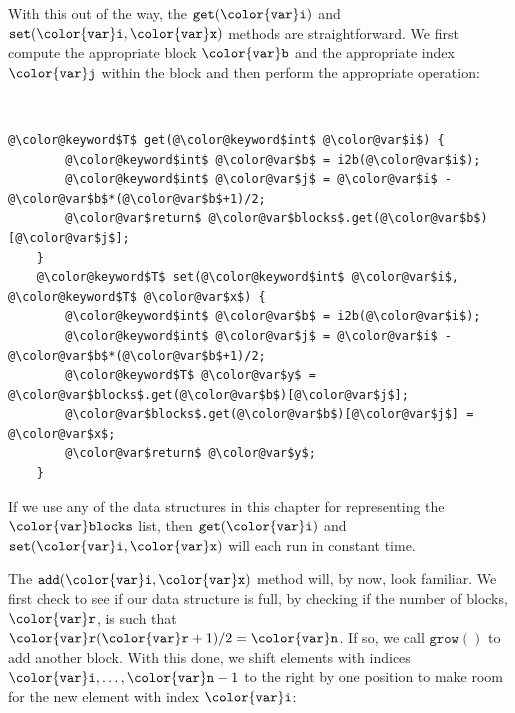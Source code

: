 \documentclass[10pt]{book}
\theoremstyle{plain}
\theoremstyle{definition}
\begin{document}
With this out of the way, the \ensuremath{\mathtt{get({\color{var}i})}} and \ensuremath{\mathtt{set({\color{var}i},{\color{var}x})}} methods are straightforward.  We first compute the appropriate block \ensuremath{\mathtt{{\color{var}b}}} and the appropriate index \ensuremath{\mathtt{{\color{var}j}}} within the block and then perform the appropriate operation:



 \ \vspace{.5ex}\begin{Verbatim}[gobble=1,tabsize=2,frame=single,framerule=1.2pt,commandchars=\\@\$,label=\texttt{RootishArrayStack},labelposition=topline]
	@\color@keyword$T$ get(@\color@keyword$int$ @\color@var$i$) {
		@\color@keyword$int$ @\color@var$b$ = i2b(@\color@var$i$);
		@\color@keyword$int$ @\color@var$j$ = @\color@var$i$ - @\color@var$b$*(@\color@var$b$+1)/2;
		@\color@var$return$ @\color@var$blocks$.get(@\color@var$b$)[@\color@var$j$];
	}
	@\color@keyword$T$ set(@\color@keyword$int$ @\color@var$i$, @\color@keyword$T$ @\color@var$x$) {
		@\color@keyword$int$ @\color@var$b$ = i2b(@\color@var$i$);
		@\color@keyword$int$ @\color@var$j$ = @\color@var$i$ - @\color@var$b$*(@\color@var$b$+1)/2;
		@\color@keyword$T$ @\color@var$y$ = @\color@var$blocks$.get(@\color@var$b$)[@\color@var$j$];
		@\color@var$blocks$.get(@\color@var$b$)[@\color@var$j$] = @\color@var$x$;
		@\color@var$return$ @\color@var$y$;
	}
\end{Verbatim}


If we use any of the data structures in this chapter for representing the \ensuremath{\mathtt{{\color{var}blocks}}} list, then \ensuremath{\mathtt{get({\color{var}i})}} and \ensuremath{\mathtt{set({\color{var}i},{\color{var}x})}} will each run in constant time.

The \ensuremath{\mathtt{add({\color{var}i},{\color{var}x})}} method will, by now, look familiar.  We first check
to see if our data structure is full, by checking if the number of
blocks, \ensuremath{\mathtt{{\color{var}r}}}, is such that $\ensuremath{\mathtt{{\color{var}r}}}(\ensuremath{\mathtt{{\color{var}r}}}+1)/2 = \ensuremath{\mathtt{{\color{var}n}}}$. If so, we call \ensuremath{\mathtt{grow()}}
to add another block.  With this done, we shift elements with indices
$\ensuremath{\mathtt{{\color{var}i}}},\ldots,\ensuremath{\mathtt{{\color{var}n}}}-1$ to the right by one position to make room for the
new element with index \ensuremath{\mathtt{{\color{var}i}}}:
\end{document}
